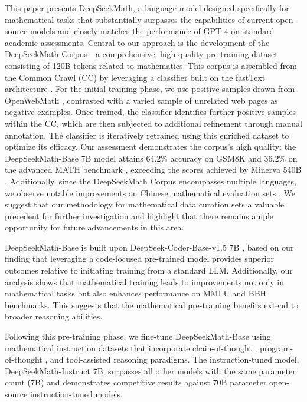 This paper presents DeepSeekMath, a language model designed specifically for mathematical tasks that substantially surpasses the capabilities of current open-source models and closely matches the performance of GPT-4 on standard academic assessments. Central to our approach is the development of the DeepSeekMath Corpus—a comprehensive, high-quality pre-training dataset consisting of 120B tokens related to mathematics. This corpus is assembled from the Common Crawl (CC) by leveraging a classifier built on the fastText architecture \citep{joulin2016fasttext}. For the initial training phase, we use positive samples drawn from OpenWebMath \citep{openwebmath}, contrasted with a varied sample of unrelated web pages as negative examples. Once trained, the classifier identifies further positive samples within the CC, which are then subjected to additional refinement through manual annotation. The classifier is iteratively retrained using this enriched dataset to optimize its efficacy. Our assessment demonstrates the corpus’s high quality: the DeepSeekMath-Base 7B model attains 64.2\% accuracy on GSM8K \citep{gsm8k} and 36.2\% on the advanced MATH benchmark \citep{MATH}, exceeding the scores achieved by Minerva 540B \citep{minerva}. Additionally, since the DeepSeekMath Corpus encompasses multiple languages, we observe notable improvements on Chinese mathematical evaluation sets \citep{wei2023cmath,agieval}. We suggest that our methodology for mathematical data curation sets a valuable precedent for further investigation and highlight that there remains ample opportunity for future advancements in this area.

DeepSeekMath-Base is built upon DeepSeek-Coder-Base-v1.5 7B \citep{deepseek-coder}, based on our finding that leveraging a code-focused pre-trained model provides superior outcomes relative to initiating training from a standard LLM. Additionally, our analysis shows that mathematical training leads to improvements not only in mathematical tasks but also enhances performance on MMLU \citep{mmlu} and BBH \citep{bbh} benchmarks. This suggests that the mathematical pre-training benefits extend to broader reasoning abilities.

Following this pre-training phase, we fine-tune DeepSeekMath-Base using mathematical instruction datasets that incorporate chain-of-thought \citep{cot}, program-of-thought \citep{pot,pal}, and tool-assisted reasoning \citep{tora} paradigms. The instruction-tuned model, DeepSeekMath-Instruct 7B, surpasses all other models with the same parameter count (7B) and demonstrates competitive results against 70B parameter open-source instruction-tuned models.

